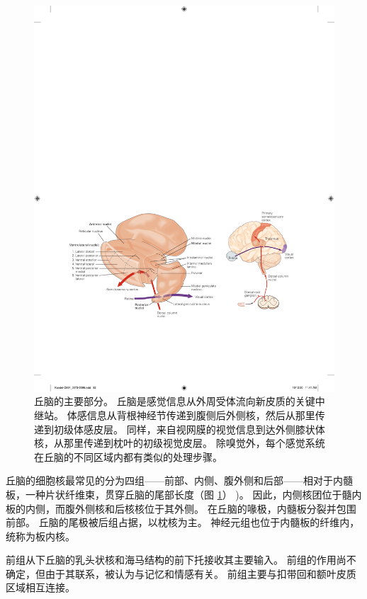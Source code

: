 \begin{figure}[htbp]
	\centering
	\includegraphics[width=1.0\linewidth]{chap04/fig_4_7}
	\caption{丘脑的主要部分。 
		丘脑是感觉信息从外周受体流向新皮质的关键中继站。 
		体感信息从背根神经节传递到腹侧后外侧核，然后从那里传递到初级体感皮层。 
		同样，来自视网膜的视觉信息到达外侧膝状体核，从那里传递到枕叶的初级视觉皮层。 
		除嗅觉外，每个感觉系统在丘脑的不同区域内都有类似的处理步骤。}
	\label{fig:4_7}
\end{figure}


丘脑的细胞核最常见的分为四组——前部、内侧、腹外侧和后部——相对于内髓板，一种片状纤维束，贯穿丘脑的尾部长度（图 \ref{fig:4_7}） )。
因此，内侧核团位于髓内板的内侧，而腹外侧核和后核核位于其外侧。 
在丘脑的喙极，内髓板分裂并包围前部。 
丘脑的尾极被后组占据，以枕核为主。 
神经元组也位于内髓板的纤维内，统称为板内核。


前组从下丘脑的乳头状核和海马结构的前下托接收其主要输入。 
前组的作用尚不确定，但由于其联系，被认为与记忆和情感有关。 
前组主要与扣带回和额叶皮质区域相互连接。


